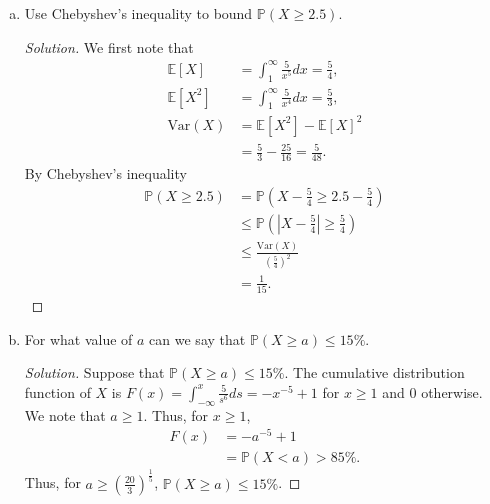 \documentclass[addpoints, 11pt]{exam}
\newcommand*{\prob}{\mathds{P}}
\newcommand*{\E}{\mathds{E}}
\begin{document}
\begin{enumerate}[(a)]
    \color{crimson}
    \item  Use Chebyshev’s inequality to bound $\prob(X \geq 2.5)$.
    \normalcolor
    
    \begin{proof}[Solution]
        We first note that
        \begin{align*}
            \E[X]
            &= \int^{\infty}_1 \frac{5}{x^5} dx = \frac{5}{4}, \\
            \E[X^2]
            &= \int^{\infty}_1 \frac{5}{x^4} dx = \frac{5}{3}, \\
            \text{Var}(X)
            &= \E[X^2] - \E[X]^2 \\
            &= \frac{5}{3} - \frac{25}{16} = \frac{5}{48}.
        \end{align*}
        By Chebyshev’s inequality
        \begin{align}
            \prob(X \geq 2.5)
            &= \prob\left(X - \frac{5}{4} \geq 2.5 - \frac{5}{4}\right) \\
            &\leq \prob\left(|X - \frac{5}{4}| \geq \frac{5}{4}\right) \\
            &\leq \frac{\text{Var}(X)}{\left(\frac{5}{4}\right)^2} \\
            &= \frac{1}{15}.
        \end{align}
    \end{proof}

    \color{crimson}
    \item   For what value of $a$ can we say that $\prob(X \geq a) \leq 15\%$.
    \normalcolor
    
    \begin{proof}[Solution]
        Suppose that $\prob(X \geq a) \leq 15\%$. The cumulative distribution function of $X$ is $F(x) = \int^x_{-\infty} \frac{5}{s^6} ds = -x^{-5} + 1$ for $x \geq 1$ and $0$ otherwise. We note that $a \geq 1$. Thus, for $x \geq 1$,
        \begin{align*}
            F(x)
            &= -a^{-5} + 1 \\
            &= \prob(X < a) > 85\%.
        \end{align*}
        Thus, for $a \geq \left(\frac{20}{3}\right)^{\frac{1}{5}}$, $\prob(X \geq a) \leq 15\%$.
    \end{proof}
\end{enumerate}
\end{document}
